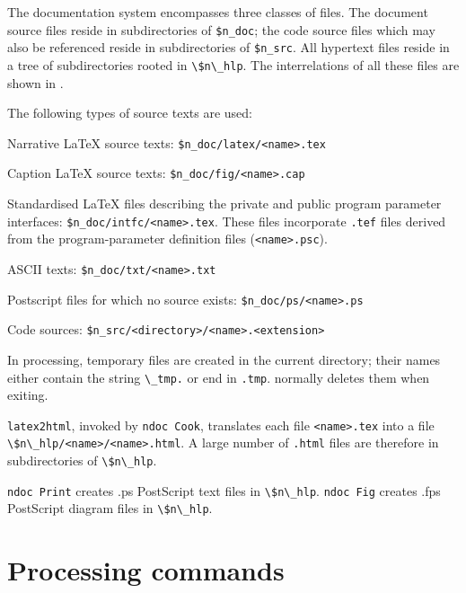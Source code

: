  
 

        The documentation system encompasses three classes of files. The
document source files reside in subdirectories of \verb/$n_doc/; the code
source files which may also be referenced reside in subdirectories of 
\verb/$n_src/. All hypertext files reside in a tree of subdirectories rooted in 
\verb/\$n\_hlp/. The interrelations of all these files are shown in 
. 

        The following types of source texts are used: 
\bi 
\item   Narrative LaTeX source texts: \verb:$n_doc/latex/<name>.tex: 

\item   Caption LaTeX source texts: \verb:$n_doc/fig/<name>.cap: 

\item   Standardised LaTeX files describing the private and public program
parameter interfaces: \verb:$n_doc/intfc/<name>.tex:. These files incorporate 
\verb/.tef/ files derived from the program-parameter definition files
(\verb/<name>.psc/). 

\item   ASCII texts: \verb:$n_doc/txt/<name>.txt: 

\item   Postscript files for which no source exists: \verb:$n_doc/ps/<name>.ps: 

\item   Code sources: \verb:$n_src/<directory>/<name>.<extension>: 
\ei 

        In processing, temporary files are created in the current directory;
their names either contain the string \verb/\_tmp./ or end in \verb/.tmp/. 
\ndoc normally deletes them when exiting. 

        \verb/latex2html/, invoked by \verb/ndoc Cook/, translates each file 
\verb/<name>.tex/ into a file 
\verb:\$n\_hlp/<name>/<name>.html:. A large number of 
\verb/.html/ files are therefore in subdirectories of 
\verb/\$n\_hlp/. 

        \verb/ndoc Print/ creates .ps PostScript text files in \verb/\$n\_hlp/. 
        \verb/ndoc Fig/ creates .fps PostScript diagram files in 
\verb/\$n\_hlp/. 




\section {Processing commands} 


